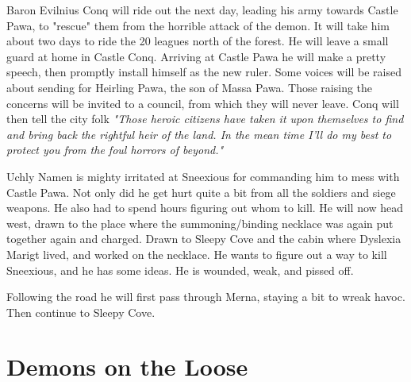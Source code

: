 Baron Evilnius Conq will ride out the next day, leading his army towards Castle Pawa, to "rescue" them from the horrible attack of the demon. It will take him about two days to ride the 20 leagues north of the forest. He will leave a small guard at home in Castle Conq. Arriving at Castle Pawa he will make a pretty speech, then promptly install himself as the new ruler. Some voices will be raised about sending for Heirling Pawa, the son of Massa Pawa. Those raising the concerns will be invited to a council, from which they will never leave. Conq will then tell the city folk \emph{"Those heroic citizens have taken it upon themselves to find and bring back the rightful heir of the land. In the mean time I'll do my best to protect you from the foul horrors of beyond."}

Uchly Namen is mighty irritated at Sneexious for commanding him to mess with Castle Pawa. Not only did he get hurt quite a bit from all the soldiers and siege weapons. He also had to spend hours figuring out whom to kill.
He will now head west, drawn to the place where the summoning/binding necklace was again put together again and charged. Drawn to Sleepy Cove and the cabin where Dyslexia Marigt lived, and worked on the necklace. He wants to figure out a way to kill Sneexious, and he has some ideas. He is wounded, weak, and pissed off.

Following the road he will first pass through Merna, staying a bit to wreak havoc. Then continue to Sleepy Cove.


%



















\clearpage
{}
\section*{Demons on the Loose}



